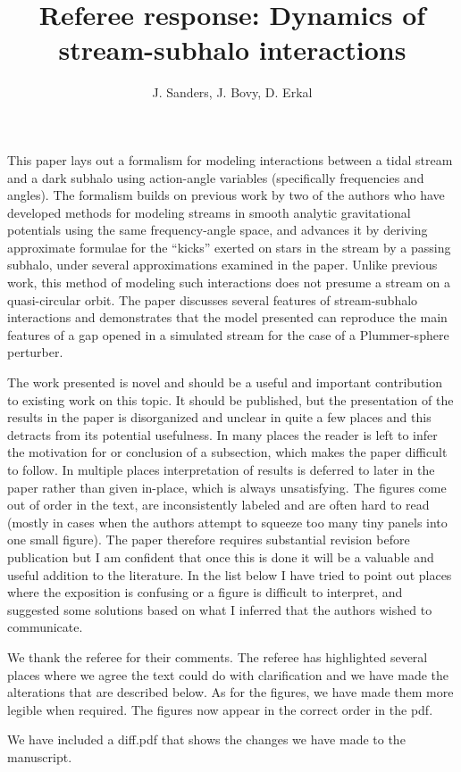 \documentclass{article}
\title{Referee response: Dynamics of stream-subhalo interactions}
\author{J. Sanders, J. Bovy, D. Erkal}
\begin{document}
\maketitle


This paper lays out a formalism for modeling interactions between a tidal stream and a
dark subhalo using action-angle variables (specifically frequencies and angles). The
formalism builds on previous work by two of the authors who have developed methods
for modeling streams in smooth analytic gravitational potentials using the same
frequency-angle space, and advances it by deriving approximate formulae for the
“kicks” exerted on stars in the stream by a passing subhalo, under several
approximations examined in the paper. Unlike previous work, this method of modeling
such interactions does not presume a stream on a quasi-circular orbit. The paper
discusses several features of stream-subhalo interactions and demonstrates that the
model presented can reproduce the main features of a gap opened in a simulated
stream for the case of a Plummer-sphere perturber.


The work presented is novel and should be a useful and important contribution to
existing work on this topic. It should be published, but the presentation of the results in
the paper is disorganized and unclear in quite a few places and this detracts from its
potential usefulness. In many places the reader is left to infer the motivation for or
conclusion of a subsection, which makes the paper difficult to follow. In multiple places
interpretation of results is deferred to later in the paper rather than given in-place, which
is always unsatisfying. The figures come out of order in the text, are inconsistently
labeled and are often hard to read (mostly in cases when the authors attempt to
squeeze too many tiny panels into one small figure). The paper therefore requires
substantial revision before publication but I am confident that once this is done it will be
a valuable and useful addition to the literature.
In the list below I have tried to point out places where the exposition is confusing or a
figure is difficult to interpret, and suggested some solutions based on what I inferred that
the authors wished to communicate.


{\color{red} We thank the referee for their comments. The referee has highlighted several places where we agree the text could do with clarification and we have made the alterations that are described below. As for the figures, we have made them more legible when required. The figures now appear in the correct order in the pdf.

We have included a diff.pdf that shows the changes we have made to the manuscript.
}
\end{document}
